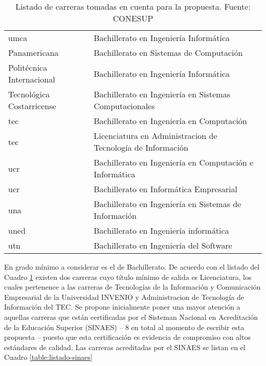 \begin{table}[h!]
\begin{tabular}{ll}
        \gls{umca} & Bachillerato en Ingeniería Informática \\
        Panamericana & Bachillerato en Sistemas de Computación \\
        Politécnica Internacional	& Bachillerato en Ingeniería Informática \\
        Tecnológica Costarricense & Bachillerato en Ingeniería en Sistemas Computacionales \\
        \gls{tec} & Bachillerato en Ingeniería en Computación \\
        \gls{tec} & Licenciatura en Administracion de Tecnología de Información \\
        \gls{ucr} & Bachillerato en Ingeniería en Computación e Informática \\
        \gls{ucr} & Bachillerato en Informática Empresarial \\
        \gls{una} & Bachillerato en Ingeniería en Sistemas de Información \\
        \gls{uned} & Bachillerato en Ingeniería informática \\
        \gls{utn} & Bachillerato en Ingeniería del Software \\
        \bottomrule[1.5pt]        
    \end{tabular}
    \caption{Listado de carreras tomadas en cuenta para la propuesta. Fuente: CONESUP}
    \label{table:listado-conesup}
\end{table}

En grado mínimo a considerar es el de Bachillerato. De acuerdo con el listado del Cuadro \ref{table:listado-conesup} existen dos carreras cuyo título mínimo de salida es Licenciatura, los cuales pertenence a las carreras de Tecnologías de la Información y Comunicación Empresarial de la Universidad INVENIO y Administracion de Tecnología de Información del TEC. Se propone inicialmente poner una mayor atención a aquellas carreras que están certificadas por el Sisteman Nacional en Acreditación de la Educación Superior (SINAES) -- 8 en total al momento de escribir esta propuesta -- puesto que esta certificación es evidencia de compromiso con altos estándares de calidad. Las carreras acreditadas por el SINAES \cite{sinaes} se listan en el Cuadro \ref{table:listado-sinaes}

